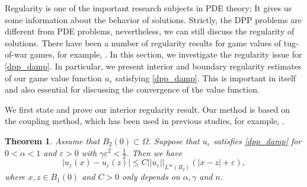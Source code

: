 \documentclass[english]{amsart}
\newcommand{\eps}{\varepsilon}
\theoremstyle{plain}
\newtheorem{theorem}[definition]{Theorem}
\theoremstyle{definition}
\theoremstyle{remark}
\numberwithin{equation}{section}
\begin{document}
Regularity is one of the important research subjects in PDE theory; It gives us some information about the behavior of solutions.
Strictly, the DPP problems are different from PDE problems, nevertheless, we can still discuss the regularity of solutions.
There have been a number of regularity results for game values of tug-of-war games, for example, \cite{MR3494400,MR3698169,MR3846232,MR4125101}. 
In this section, we investigate the regularity issue for \eqref{dpp_damp}.
In particular, we present interior and boundary regularity estimates of our game value function $u_{\eps}$ satisfying \eqref{dpp_damp}.
This is important in itself and also essential for discussing the convergence of the value function.

We first state and prove our interior regularity result. Our method is based on the coupling method, which has been used in previous studies, for example, \cite{MR3846232,MR3494400}.
\begin{theorem}\label{intes}Assume that $B_{2}(0) \subset \Omega$. 
Suppose that $u_{\eps}$ satisfies \eqref{dpp_damp} for $ 0< \alpha < 1 $ and $\eps>0$ with $\gamma\eps^2<\frac{1}{2}$.
Then we have
$$ |u_{\eps} (x) - u_{\eps} (z) | \le C ||u_{\eps}||_{L^{\infty}(B_2)} ( |x-z| + \eps) ,$$ where $x, z \in B_{1}(0)$ and $C>0$ only depends on $ \alpha, \gamma$ and $n$.
\end{theorem}
\end{document}
